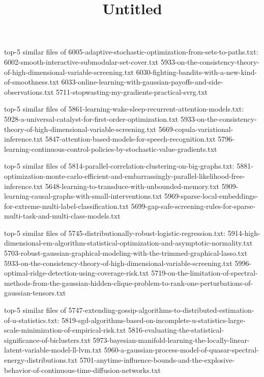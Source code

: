 \documentclass[11pt]{article}
\title{Untitled}
\begin{document}
    
    
    \maketitle
    
    

    
    top-5 similar files of
6005-adaptive-stochastic-optimization-from-sets-to-paths.txt:
6002-smooth-interactive-submodular-set-cover.txt
5933-on-the-consistency-theory-of-high-dimensional-variable-screening.txt
6030-fighting-bandits-with-a-new-kind-of-smoothness.txt
6033-online-learning-with-gaussian-payoffs-and-side-observations.txt
5711-stopwasting-my-gradients-practical-svrg.txt

top-5 similar files of
5861-learning-wake-sleep-recurrent-attention-models.txt:
5928-a-universal-catalyst-for-first-order-optimization.txt
5933-on-the-consistency-theory-of-high-dimensional-variable-screening.txt
5669-copula-variational-inference.txt
5847-attention-based-models-for-speech-recognition.txt
5796-learning-continuous-control-policies-by-stochastic-value-gradients.txt

top-5 similar files of
5814-parallel-correlation-clustering-on-big-graphs.txt:
5881-optimization-monte-carlo-efficient-and-embarrassingly-parallel-likelihood-free-inference.txt
5648-learning-to-transduce-with-unbounded-memory.txt
5909-learning-causal-graphs-with-small-interventions.txt
5969-sparse-local-embeddings-for-extreme-multi-label-classification.txt
5699-gap-safe-screening-rules-for-sparse-multi-task-and-multi-class-models.txt

top-5 similar files of
5745-distributionally-robust-logistic-regression.txt:
5914-high-dimensional-em-algorithm-statistical-optimization-and-asymptotic-normality.txt
5703-robust-gaussian-graphical-modeling-with-the-trimmed-graphical-lasso.txt
5933-on-the-consistency-theory-of-high-dimensional-variable-screening.txt
5996-optimal-ridge-detection-using-coverage-risk.txt
5719-on-the-limitation-of-spectral-methods-from-the-gaussian-hidden-clique-problem-to-rank-one-perturbations-of-gaussian-tensors.txt

top-5 similar files of
5747-extending-gossip-algorithms-to-distributed-estimation-of-u-statistics.txt:
5819-sgd-algorithms-based-on-incomplete-u-statistics-large-scale-minimization-of-empirical-risk.txt
5816-evaluating-the-statistical-significance-of-biclusters.txt
5973-bayesian-manifold-learning-the-locally-linear-latent-variable-model-ll-lvm.txt
5960-a-gaussian-process-model-of-quasar-spectral-energy-distributions.txt
5701-anytime-influence-bounds-and-the-explosive-behavior-of-continuous-time-diffusion-networks.txt
\end{document}
